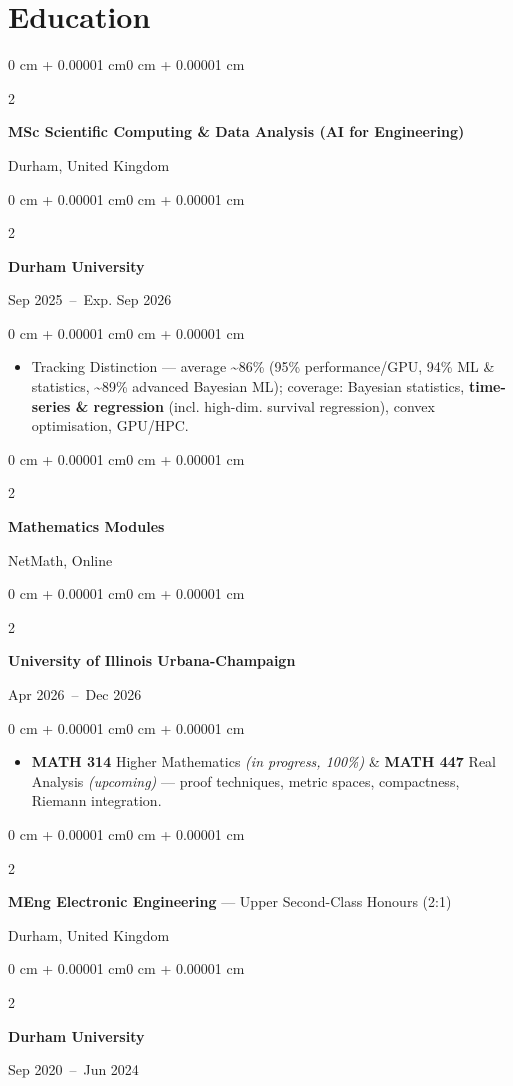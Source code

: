 \documentclass[10pt, letterpaper]{article}
\newenvironment{highlights}{
    \begin{itemize}[
        topsep=0.10 cm,
        parsep=0.10 cm,
        partopsep=0pt,
        itemsep=0pt,
        leftmargin=0 cm + 10pt
    ]
}{
    \end{itemize}
}
\newenvironment{onecolentry}{
    \begin{adjustwidth}{0 cm + 0.00001 cm}{0 cm + 0.00001 cm}
}{
    \end{adjustwidth}
}
\newenvironment{twocolentry}[2][]{
    \onecolentry{}
    \def\secondColumn{#2}
    \setcolumnwidth{\fill, 4.5 cm}
    \begin{paracol}{2}
}{
    \switchcolumn{} \raggedleft{} \secondColumn{}
    \end{paracol}
    \endonecolentry{}
}
\begin{document}
\section*{Education}

\begin{twocolentry}
  {Durham, United Kingdom}
  \textbf{MSc Scientific Computing \& Data Analysis (AI for Engineering)}
\end{twocolentry}
\begin{twocolentry}
  {Sep 2025~--~Exp. Sep 2026}
  \textbf{Durham University}
\end{twocolentry}
\vspace{0.10 cm}

\begin{onecolentry}
  \begin{highlights}
    \item Tracking Distinction --- average \textasciitilde86\% (95\% performance/GPU, 94\% ML \& statistics, \textasciitilde89\% advanced Bayesian ML); coverage: Bayesian statistics, \textbf{time-series \& regression} (incl. high-dim. survival regression), convex optimisation, GPU/HPC.
  \end{highlights}
\end{onecolentry}

\vspace{0.08 cm}

\begin{twocolentry}
  {NetMath, Online}
  \textbf{Mathematics Modules}
\end{twocolentry}
\begin{twocolentry}
  {Apr 2026~--~Dec 2026}
  \textbf{University of Illinois Urbana-Champaign}
\end{twocolentry}
\vspace{0.10 cm}
\begin{onecolentry}
  \begin{highlights}
    \item \textbf{MATH 314} Higher Mathematics \textit{(in progress, 100\%)} \& \textbf{MATH 447} Real Analysis \textit{(upcoming)} --- proof techniques, metric spaces, compactness, Riemann integration.
  \end{highlights}
\end{onecolentry}

\vspace{0.08 cm}

\begin{twocolentry}
  {Durham, United Kingdom}
  \textbf{MEng Electronic Engineering} --- Upper Second-Class Honours (2:1)
\end{twocolentry}
\begin{twocolentry}
  {Sep 2020~--~Jun 2024}
  \textbf{Durham University}
\end{twocolentry}
\end{document}
